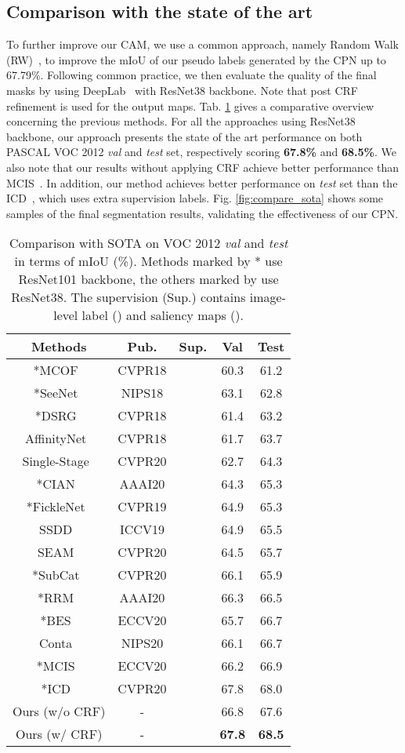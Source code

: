 \documentclass[10pt,twocolumn,letterpaper]{article}
\begin{document}
\subsection{Comparison with the state of the art}
To further improve our CAM, we use a common approach, namely Random Walk (RW)~\cite{affinity}, to improve the mIoU of our pseudo labels generated by the CPN up to 67.79\%. Following common practice, we then evaluate the quality of the final masks by using  DeepLab~\cite{v1} with ResNet38 backbone. Note that post CRF refinement is used for the output maps. Tab. \ref{tab:sota} gives a comparative overview concerning the previous methods. For all the approaches using ResNet38 backbone, our approach presents the state of the art performance on both PASCAL VOC 2012 \textit{val} and \textit{test} set, respectively scoring \textbf{67.8\%} and \textbf{68.5\%}. We also note that our results without applying CRF achieve better performance than MCIS~\cite{coatten}. In addition, our method achieves better performance on \textit{test} set than the ICD~\cite{ICD}, which uses extra supervision labels. Fig. \ref{fig:compare_sota} shows some samples of the final segmentation results, validating the effectiveness of our CPN.
\begin{table}[!htbp]\small
\centering
\begin{tabular}{c|c|c|c|c}
\hline
Methods & Pub. & Sup. & Val & Test \\
\hline
*MCOF~\cite{MCOF} & CVPR18&  & 60.3 & 61.2\\
*SeeNet~\cite{Seenet} & NIPS18 &  & 63.1 & 62.8 \\
*DSRG~\cite{dsrg} &CVPR18 &  & 61.4 & 63.2\\
AffinityNet~\cite{affinity}&CVPR18&&61.7&63.7\\
Single-Stage~\cite{1stage} &CVPR20&&62.7&64.3\\
*CIAN~\cite{CIAN}&AAAI20&&64.3&65.3\\
*FickleNet~\cite{fickle}&CVPR19&&64.9&65.3\\
SSDD~\cite{SSDD}&ICCV19&&64.9&65.5\\
SEAM~\cite{seam}&CVPR20&&64.5&65.7\\
*SubCat~\cite{subE} &CVPR20&&66.1&65.9\\
*RRM~\cite{RMM} &AAAI20&&66.3&66.5\\
*BES~\cite{BES} &ECCV20&&65.7&66.7\\
Conta~\cite{conta}&NIPS20&&66.1&66.7\\
*MCIS~\cite{coatten}&ECCV20&&66.2&66.9\\
*ICD~\cite{ICD}&CVPR20&&67.8&68.0\\
\hline
Ours (w/o CRF) &-&&66.8&67.6\\
Ours (w/ CRF) &-&&\textbf{67.8}&\textbf{68.5}\\
\hline
\end{tabular}
\caption{Comparison with SOTA on VOC 2012 \textit{val} and \textit{test} in terms of mIoU (\%). Methods marked by * use ResNet101 backbone, the others marked by  use ResNet38. The supervision (Sup.) contains image-level label () and saliency maps ().}
\label{tab:sota}
\end{table}
\end{document}

